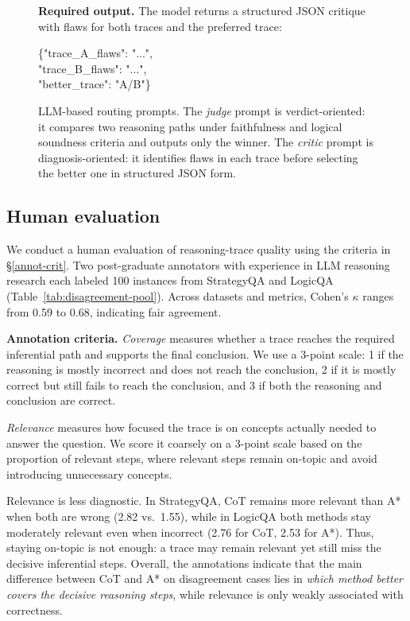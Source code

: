 \documentclass[11pt]{article}
\begin{document}
{\begin{figure}[t]
\begin{minipage}[t]{0.485\textwidth}
\begin{tcolorbox}[promptcard,title=LLM-as-Critic]
\vspace{-2pt}
\textbf{Required output.}
The model returns a structured JSON critique with flaws for both traces and the preferred trace:
\begin{center}
\ttfamily
\{"trace\_A\_flaws": "...",\\
"trace\_B\_flaws": "...",\\
"better\_trace": "A/B"\}
\end{center}
\end{tcolorbox}
\end{minipage}

\vspace{2pt}
\caption{LLM-based routing prompts. The \emph{judge} prompt is verdict-oriented: it compares two reasoning paths under faithfulness and logical soundness criteria and outputs only the winner. The \emph{critic} prompt is diagnosis-oriented: it identifies flaws in each trace before selecting the better one in structured JSON form.}
\label{fig:judge_critic_prompts}
\end{figure}




\subsection{Human evaluation}\label{app:human_eval}
We conduct a human evaluation of reasoning-trace quality using the criteria in \S\ref{annot-crit}. Two post-graduate annotators with experience in LLM reasoning research each labeled 100 instances from StrategyQA and LogicQA (Table~\ref{tab:disagreement-pool}). Across datasets and metrics, Cohen's \(\kappa\) ranges from 0.59 to 0.68, indicating fair agreement.


\noindent\textbf{Annotation criteria.}\label{annot-crit}
\textit{Coverage} measures whether a trace reaches the required inferential path and supports the final conclusion. We use a 3-point scale: 1 if the reasoning is mostly incorrect and does not reach the conclusion, 2 if it is mostly correct but still fails to reach the conclusion, and 3 if both the reasoning and conclusion are correct.

\noindent\textit{Relevance} measures how focused the trace is on concepts actually needed to answer the question. We score it coarsely on a 3-point scale based on the proportion of relevant steps, where relevant steps remain on-topic and avoid introducing unnecessary concepts.

\noindent Relevance is less diagnostic. In StrategyQA, CoT remains more relevant than A* when both are wrong (2.82 vs.\ 1.55), while in LogicQA both methods stay moderately relevant even when incorrect (2.76 for CoT, 2.53 for A*). Thus, staying on-topic is not enough: a trace may remain relevant yet still miss the decisive inferential steps. Overall, the annotations indicate that the main difference between CoT and A* on disagreement cases lies in \emph{which method better covers the decisive reasoning steps}, while relevance is only weakly associated with correctness.


}
\end{document}

